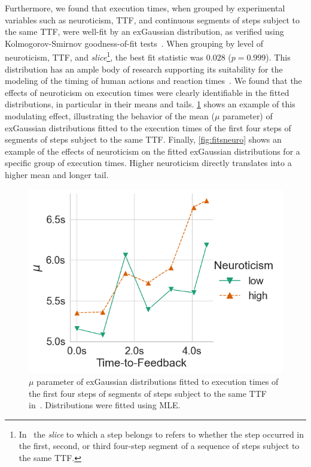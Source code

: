 Furthermore, we found that execution times, when grouped by experimental variables such as neuroticism, \gls{TTF}, and continuous segments of steps subject to the same \gls{TTF}, were well-fit by an \gls{exGaussian} distribution, as verified using Kolmogorov-Smirnov goodness-of-fit tests~\cite{massey_jr1951kolmogorov}.
When grouping by level of neuroticism, \gls{TTF}, and \emph{slice}\footnote{%
In~\cite{olguinmunoz2021impact} the \emph{slice} to which a step belongs to refers to whether the step occurred in the first, second, or third four-step segment of a sequence of steps subject to the same \gls{TTF}.
}, the best fit statistic was \ensuremath{0.028} (\ensuremath{p = 0.999}).
This distribution has an ample body of research supporting its suitability for the modeling of the timing of human actions and reaction times~\cite{rohrer1994analysis,palmer2011what,marmolejo_ramos2022generalised}.
We found that the effects of neuroticism on execution times were clearly identifiable in the fitted distributions, in particular in their means and tails.
\cref{fig:muexgaussian} shows an example of this modulating effect, illustrating the behavior of the mean (\( \mu \) parameter) of \gls{exGaussian} distributions fitted to the execution times of the first four steps of segments of steps subject to the same \gls{TTF}.
Finally, \cref{fig:fitsneuro} shows an example of the effects of neuroticism on the fitted \gls{exGaussian} distributions for a specific group of execution times.
Higher neuroticism directly translates into a higher mean and longer tail.

\begin{figure}
    \centering
    \includegraphics[width=.9\columnwidth]{figs/new_model/mu_fits_exgaussian_slice0}
    \caption{%
        \( \mu \) parameter of \gls{exGaussian} distributions fitted to execution times of the first four steps of segments of steps subject to the same \gls{TTF} in~\cite{olguinmunoz2021impact}.
        Distributions were fitted using \gls{MLE}.
    }\label{fig:muexgaussian}
\end{figure}

